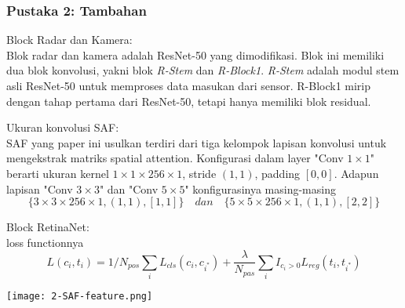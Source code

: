 \begin{frame}[allowframebreaks]
    \frametitle{Pustaka 2: Tambahan}
    \justifying

    Block Radar dan Kamera:\\
    Blok radar dan kamera adalah ResNet-50 yang dimodifikasi. Blok ini memiliki dua blok konvolusi, yakni blok \textit{R-Stem} dan \textit{R-Block1}. \textit{R-Stem} adalah modul stem asli ResNet-50 untuk memproses data masukan dari sensor. R-Block1 mirip dengan tahap pertama dari ResNet-50, tetapi hanya memiliki blok residual.

    Ukuran konvolusi SAF:\\
    SAF yang paper ini usulkan terdiri dari tiga kelompok lapisan konvolusi untuk mengekstrak matriks spatial attention. Konfigurasi dalam layer "Conv $1 \times 1$" berarti ukuran kernel $1 \times 1 \times 256 \times 1$, stride $(1, 1)$, padding $[0, 0]$. Adapun lapisan "Conv $3 \times 3$" dan "Conv $5 \times 5$" konfigurasinya masing-masing
    $$
        \{3 \times 3 \times 256 \times 1, (1, 1), [1, 1]\}
        \quad dan \quad
        \{5 \times 5 \times 256 \times 1, (1, 1), [2, 2]\}
    $$

    Block RetinaNet:\\
    loss functionnya
    \begin{equation}
        L\left(c_{i}, t_{i}\right)=1 / N_{p o s} \sum_{i} L_{c l s}\left(c_{i}, c_{i^{*}}\right)+\frac{\lambda}{N_{p a s}} \sum_{i} I_{c_{i}>0} L_{r e g}\left(t_{i}, t_{i^{*}}\right)
        \label{eq: FCOS-loss-fn}
    \end{equation}

    \begin{center}        
        \texttt{[image: 2-SAF-feature.png]}
    \end{center}

\end{frame}